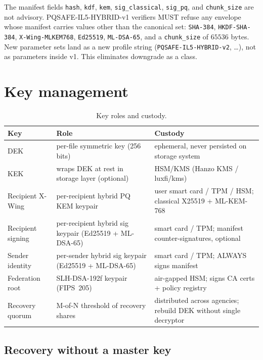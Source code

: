 \documentclass[11pt,a4paper]{article}
\begin{document}
The manifest fields \texttt{hash}, \texttt{kdf}, \texttt{kem},
\texttt{sig\_classical}, \texttt{sig\_pq}, and \texttt{chunk\_size}
are not advisory. PQSAFE-IL5-HYBRID-v1 verifiers MUST refuse any
envelope whose manifest carries values other than the canonical set:
\texttt{SHA-384}, \texttt{HKDF-SHA-384}, \texttt{X-Wing-MLKEM768},
\texttt{Ed25519}, \texttt{ML-DSA-65}, and a \texttt{chunk\_size} of
\(65536\) bytes. New parameter sets land as a new profile string
(\texttt{PQSAFE-IL5-HYBRID-v2}, \dots), not as parameters inside v1.
This eliminates downgrade as a class.

\section{Key management}
\label{sec:keys}

\begin{table}[H]
\centering
\small
\begin{tabularx}{\linewidth}{l l X}
\toprule
\textbf{Key} & \textbf{Role} & \textbf{Custody} \\
\midrule
DEK & per-file symmetric key (256 bits) & ephemeral, never persisted on storage system \\
KEK & wraps DEK at rest in storage layer (optional) & HSM/KMS (Hanzo KMS / luxfi/kms) \\
Recipient X-Wing & per-recipient hybrid PQ KEM keypair & user smart card / TPM / HSM; classical X25519 + ML-KEM-768 \\
Recipient signing & per-recipient hybrid sig keypair (Ed25519 + ML-DSA-65) & smart card / TPM; manifest counter-signatures, optional \\
Sender identity & per-sender hybrid sig keypair (Ed25519 + ML-DSA-65) & smart card / TPM; ALWAYS signs manifest \\
Federation root & SLH-DSA-192f keypair (FIPS~205) & air-gapped HSM; signs CA certs + policy registry \\
Recovery quorum & M-of-N threshold of recovery shares & distributed across agencies; rebuild DEK without single decryptor \\
\bottomrule
\end{tabularx}
\caption{Key roles and custody.}
\end{table}

\subsection{Recovery without a master key}
\label{sec:recovery}
\end{document}
